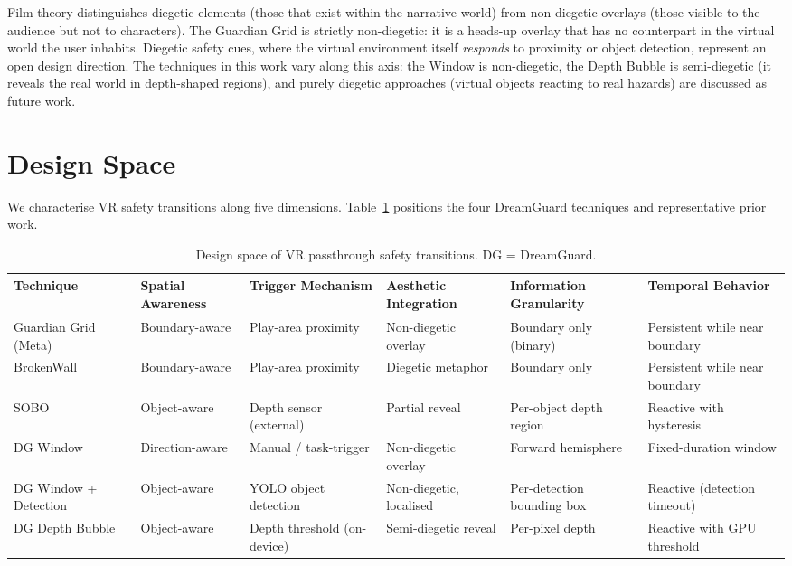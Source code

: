 \documentclass{styling/vgtc} %
\begin{document}
Film theory distinguishes diegetic elements (those that exist within the
narrative world) from non-diegetic overlays (those visible to the
audience but not to characters). The Guardian Grid is strictly
non-diegetic: it is a heads-up overlay that has no counterpart in the
virtual world the user inhabits. Diegetic safety cues, where the virtual
environment itself \emph{responds} to proximity or object detection,
represent an open design direction. The techniques in this work vary
along this axis: the Window is non-diegetic, the Depth Bubble is
semi-diegetic (it reveals the real world in depth-shaped regions), and
purely diegetic approaches (virtual objects reacting to real hazards)
are discussed as future work.


\section{Design Space}
\label{sec:designspace}

We characterise VR safety transitions along five dimensions. Table~\ref{tab:designspace}
positions the four DreamGuard techniques and representative prior work.

\begin{table}[t]
\centering
\caption{Design space of VR passthrough safety transitions. DG = DreamGuard.}
\label{tab:designspace}
\renewcommand{\arraystretch}{1.25}
\small
\begin{tabular}{@{} p{2.2cm} p{2.0cm} p{2.3cm} p{2.2cm} p{2.3cm} p{2.8cm} @{}}
\toprule
\textbf{Technique} &
\textbf{Spatial Awareness} &
\textbf{Trigger Mechanism} &
\textbf{Aesthetic Integration} &
\textbf{Information Granularity} &
\textbf{Temporal Behavior} \\
\midrule
Guardian Grid (Meta)
  & Boundary-aware
  & Play-area proximity
  & Non-diegetic overlay
  & Boundary only (binary)
  & Persistent while near boundary \\

BrokenWall~\cite{qin2024brokenwall}
  & Boundary-aware
  & Play-area proximity
  & Diegetic metaphor
  & Boundary only
  & Persistent while near boundary \\

SOBO~\cite{sobo2024}
  & Object-aware
  & Depth sensor (external)
  & Partial reveal
  & Per-object depth region
  & Reactive with hysteresis \\
\midrule
DG Window
  & Direction-aware
  & Manual / task-trigger
  & Non-diegetic overlay
  & Forward hemisphere
  & Fixed-duration window \\

DG Window + Detection
  & Object-aware
  & YOLO object detection
  & Non-diegetic, localised
  & Per-detection bounding box
  & Reactive (detection timeout) \\

DG Depth Bubble
  & Object-aware
  & Depth threshold (on-device)
  & Semi-diegetic reveal
  & Per-pixel depth
  & Reactive with GPU threshold \\
\bottomrule
\end{tabular}
\end{table}
\end{document}
